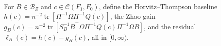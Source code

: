 For \(B\in\mathcal B_Z\) and \(c\in\mathcal C(F_1,F_0)\), define the Horvitz--Thompson baseline \(h(c)=n^{-2}\operatorname{tr}[\Pi^{-1}\Omega\Pi^{-1}Q(c)]\), the Zhao gain \(g_B(c)=n^{-2}\operatorname{tr}[S_B^{-1}B^{\top}\Omega\Pi^{-1}Q(c)\Pi^{-1}\Omega B]\), and the residual \(\ell_B(c)=h(c)-g_B(c)\), all in \([0,\infty)\).